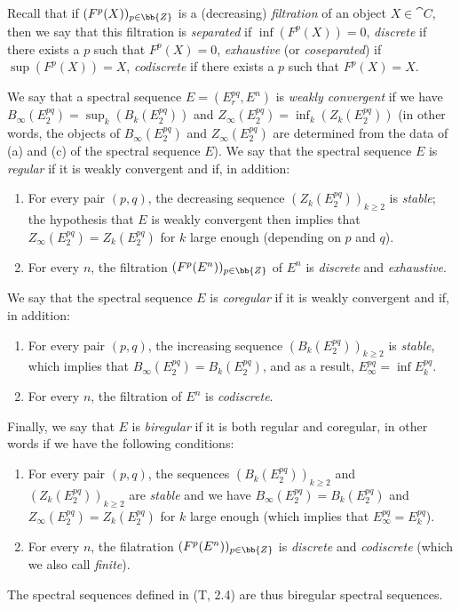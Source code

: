 \begin{env}[11.1.3]
\label{0.11.1.3}
Recall that if $(F^p(X))_{p\in\bb{Z}}$ is a (decreasing) \emph{filtration} of an object $X\in\cat{C}$, then we say that this filtration is \emph{separated} if $\inf(F^p(X))=0$, \emph{discrete} if there exists a $p$ such that $F^p(X)=0$, \emph{exhaustive} (or \emph{coseparated}) if $\sup(F^p(X))=X$, \emph{codiscrete} if there exists a $p$ such that $F^p(X)=X$.

We say that a spectral sequence $E=(E_r^{pq},E^n)$ is \emph{weakly convergent} if we have $B_\infty(E_2^{pq})=\sup_k(B_k(E_2^{pq}))$ and $Z_\infty(E_2^{pq})=\inf_k(Z_k(E_2^{pq}))$ (in other words, the objects of $B_\infty(E_2^{pq})$ and $Z_\infty(E_2^{pq})$ are determined from the data of (a) and (c) of the spectral sequence $E$).
We say that the spectral sequence $E$ is \emph{regular} if it is weakly convergent and if, in addition:
\begin{enumerate}
  \item[(1st)] For every pair $(p,q)$, the decreasing sequence $(Z_k(E_2^{pq}))_{k\geq 2}$ is \emph{stable}; the hypothesis that $E$ is weakly convergent then implies that $Z_\infty(E_2^{pq})=Z_k(E_2^{pq})$ for $k$ large enough (depending on $p$ and $q$).
  \item[(2nd)] For every $n$, the filtration $(F^p(E^n))_{p\in\bb{Z}}$ of $E^n$ is \emph{discrete} and \emph{exhaustive}.
\end{enumerate}

We say that the spectral sequence $E$ is \emph{coregular} if it is weakly convergent and if, in addition:
\begin{enumerate}
  \item[(3rd)] For every pair $(p,q)$, the increasing sequence $(B_k(E_2^{pq}))_{k\geq 2}$ is \emph{stable}, which implies that $B_\infty(E_2^{pq})=B_k(E_2^{pq})$, and as a result, $E_\infty^{pq}=\inf E_k^{pq}$.
  \item[(4th)] For every $n$, the filtration of $E^n$ is \emph{codiscrete}.
\end{enumerate}

Finally, we say that $E$ is \emph{biregular} if it is both regular and coregular, in other words if we have the following conditions:
\begin{enumerate}
  \item[(a)] For every pair $(p,q)$, the sequences $(B_k(E_2^{pq}))_{k\geq 2}$ and $(Z_k(E_2^{pq}))_{k\geq 2}$ are \emph{stable} and we have $B_\infty(E_2^{pq})=B_k(E_2^{pq})$ and $Z_\infty(E_2^{pq})=Z_k(E_2^{pq})$ for $k$ large enough (which implies that $E_\infty^{pq}=E_k^{pq}$).
  \item[(b)] For every $n$, the filatration $(F^p(E^n))_{p\in\bb{Z}}$ is \emph{discrete} and \emph{codiscrete} (which we also call \emph{finite}).
\end{enumerate}

The spectral sequences defined in (T, 2.4) are thus biregular spectral sequences.
\end{env}

